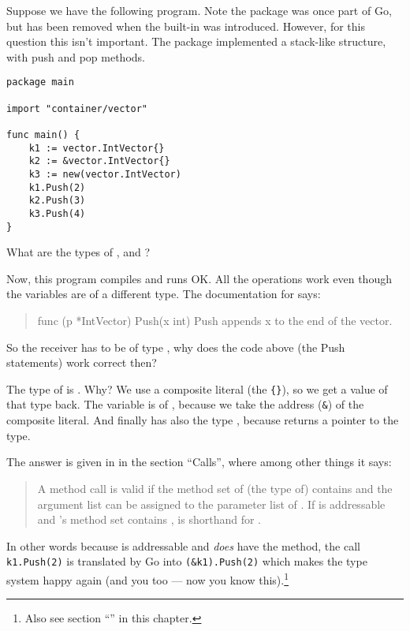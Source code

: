 \begin{Exercise}[title={Method calls},difficulty=2]
\label{ex:methodcalls}
\Question \label{ex:methodcalls q1} Suppose we have the following
program. Note the package  was once part
of Go, but has been removed when the  built-in was introduced.
However, for this question this isn't important. The package implemented
a stack-like structure, with push and pop methods.
\begin{lstlisting}
package main

import "container/vector"

func main() {
	k1 := vector.IntVector{}
	k2 := &vector.IntVector{}
	k3 := new(vector.IntVector)
	k1.Push(2)
	k2.Push(3)
	k3.Push(4)
}
\end{lstlisting}
What are the types of ,  and ?

\Question Now, this program compiles and runs OK. All the 
operations work even though the variables are of a different type. The
documentation for  says:
\begin{quote}
func (p *IntVector) Push(x int)
Push appends x to the end of the vector.
\end{quote}
So the receiver has to be of type , why does the code
above (the Push statements) work correct then?

\end{Exercise}

\begin{Answer}
\Question The type of  is . Why? We use 
a composite literal (the \verb|{}|), so we get a value of that type
back. The variable  is of , because we
take the address (\verb|&|) of the composite literal. And finally
 has also the type , because 
returns a pointer to the type.

\Question The answer is given in \cite{go_spec} in the section ``Calls'',
where among other things it says:
\begin{quote}
A method call  is valid if the method set of (the type of)
contains  and the argument list can be assigned to the parameter list
of . If  is addressable and 's method set
contains ,  is shorthand for .
\end{quote}
In other words because  is addressable and
 \emph{does} have the  method, the
call \lstinline{k1.Push(2)} is translated by Go into 
\lstinline{(&k1).Push(2)} which makes the type system happy again (and
you too --- now you know this).\footnote{Also see section
``'' in this chapter.}

\end{Answer}
